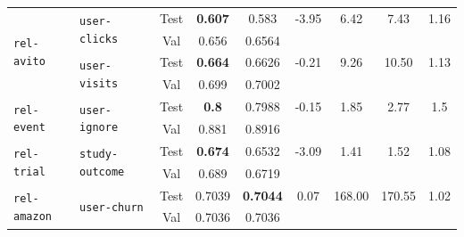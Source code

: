 \documentclass{article} %
\begin{document}
\begin{table}[t]
{\begin{tabular}{llccccccc}
\multirow{4}{*}{\texttt{rel-avito}} & \multirow{2}{*}{\texttt{user-clicks}} & Test & \textbf{0.607} & 0.583 & \cellcolor{mediumred}-3.95 & 6.42 & 7.43 & 1.16 \\ & & Val & 0.656 & 0.6564 &  &  &  &  \\ & \multirow{2}{*}{\texttt{user-visits}} & Test & \textbf{0.664} & 0.6626 & \cellcolor{mediumred}-0.21 & 9.26 & 10.50 & 1.13 \\ & & Val & 0.699 & 0.7002 &  &  &  &  \\


\midrule
\multirow{2}{*}{\texttt{rel-event}} & \multirow{2}{*}{\texttt{user-ignore}} & Test & \textbf{0.8} & 0.7988 & \cellcolor{mediumred}-0.15 & 1.85 & 2.77 & 1.5 \\ & & Val & 0.881 & 0.8916 &  &  &  &  \\

\midrule
\multirow{2}{*}{\texttt{rel-trial}} & \multirow{2}{*}{\texttt{study-outcome}} & Test & \textbf{0.674} & 0.6532 & \cellcolor{mediumred}-3.09 & 1.41 & 1.52 & 1.08 \\ & & Val & 0.689 & 0.6719 &  &  &  &  \\

\midrule
\multirow{2}{*}{\texttt{rel-amazon}} & \multirow{2}{*}{\texttt{user-churn}} & Test & 0.7039 & \textbf{0.7044} & \cellcolor{lightblue}0.07 & 168.00 & 170.55 & 1.02 \\ & & Val & 0.7036 & 0.7036 &  &  &  &  \\


\bottomrule
\end{tabular}
}
\end{table}


\end{document}
